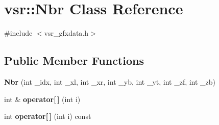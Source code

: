 \hypertarget{classvsr_1_1_nbr}{\section{vsr\-:\-:Nbr Class Reference}
\label{classvsr_1_1_nbr}
}


{\ttfamily \#include $<$vsr\-\_\-gfxdata.\-h$>$}

\subsection*{Public Member Functions}
\begin{DoxyCompactItemize}
\item 
\hypertarget{classvsr_1_1_nbr_aea2346a11103e70f8e6b08fd81b41083}{{\bfseries Nbr} (int \-\_\-idx, int \-\_\-xl, int \-\_\-xr, int \-\_\-yb, int \-\_\-yt, int \-\_\-zf, int \-\_\-zb)}\label{classvsr_1_1_nbr_aea2346a11103e70f8e6b08fd81b41083}

\item 
\hypertarget{classvsr_1_1_nbr_ad0d44ca6851ee9d39d141c1aa082a4d3}{int \& {\bfseries operator\mbox{[}$\,$\mbox{]}} (int i)}\label{classvsr_1_1_nbr_ad0d44ca6851ee9d39d141c1aa082a4d3}

\item 
\hypertarget{classvsr_1_1_nbr_a992d42316d4a51daddb6ff02a2a58d25}{int {\bfseries operator\mbox{[}$\,$\mbox{]}} (int i) const }\label{classvsr_1_1_nbr_a992d42316d4a51daddb6ff02a2a58d25}

\end{DoxyCompactItemize}
